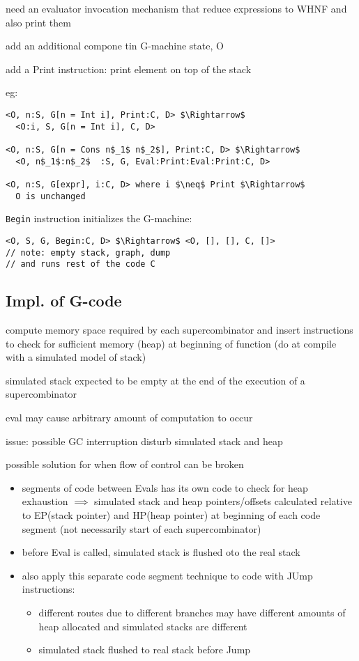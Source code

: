 \documentclass[8pt]{extarticle}
\begin{document}
\begin{multicols*}{2}
need an evaluator invocation mechanism that reduce expressions to WHNF and also print them

add an additional compone tin G-machine state, O

add a Print instruction: print element on top of the stack

eg:

\begin{lstlisting}
<O, n:S, G[n = Int i], Print:C, D> $\Rightarrow$
  <O:i, S, G[n = Int i], C, D>

<O, n:S, G[n = Cons n$_1$ n$_2$], Print:C, D> $\Rightarrow$
  <O, n$_1$:n$_2$  :S, G, Eval:Print:Eval:Print:C, D>

<O, n:S, G[expr], i:C, D> where i $\neq$ Print $\Rightarrow$
  O is unchanged
\end{lstlisting}

\verb|Begin| instruction initializes the G-machine:

\begin{lstlisting}
<O, S, G, Begin:C, D> $\Rightarrow$ <O, [], [], C, []>
// note: empty stack, graph, dump
// and runs rest of the code C
\end{lstlisting}

\subsection{Impl. of G-code}
compute memory space required by each supercombinator and insert instructions to check for sufficient memory (heap) at beginning of function (do at compile with a simulated model of stack)

simulated stack expected to be empty at the end of the execution of a supercombinator

eval may cause arbitrary amount of computation to occur

issue: possible GC interruption disturb simulated stack and heap

possible solution for when flow of control can be broken
\begin{itemize}
\item segments of code between Evals has its own code to check for heap exhaustion $\implies$ simulated stack and heap pointers/offsets calculated relative to EP(stack pointer) and HP(heap pointer) at beginning of each code segment (not necessarily start of each supercombinator)
\item before Eval is called, simulated stack is flushed oto the real stack
\item also apply this separate code segment technique to code with JUmp instructions:
  \begin{itemize}
  \item different routes due to different branches may have different amounts of heap allocated and simulated stacks are different
  \item simulated stack flushed to real stack before Jump
  \end{itemize}
\end{itemize}


\end{multicols*}
\end{document}
